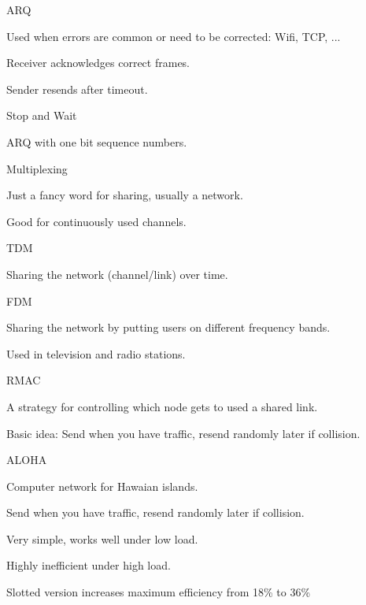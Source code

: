 \documentclass[main.tex]{subfiles}
\begin{document}
\begin{card}{ARQ}
\item Used when errors are common or need to be corrected: Wifi, TCP, ...
\item Receiver acknowledges correct frames.
\item Sender resends after timeout.
\end{card}

\begin{card}{Stop and Wait}
\item ARQ with one bit sequence numbers.
\end{card}

\begin{card}{Multiplexing}
\item Just a fancy word for sharing, usually a network.
\item Good for continuously used channels.
\end{card}

\begin{card}{TDM}
\item Sharing the network (channel/link) over time.
\end{card}

\begin{card}{FDM}
\item Sharing the network by putting users on different frequency bands.
\item Used in television and radio stations.
\end{card}

\begin{card}{RMAC}
\item A strategy for controlling which node gets to used a shared link.
\item Basic idea: Send when you have traffic, resend randomly later if collision.
\end{card}

\begin{card}{ALOHA}
\item Computer network for Hawaian islands.
\item Send when you have traffic, resend randomly later if collision.
\item Very simple, works well under low load.
\item Highly inefficient under high load.
\item Slotted version increases maximum efficiency from 18\% to 36\%
\end{card}
\end{document}
